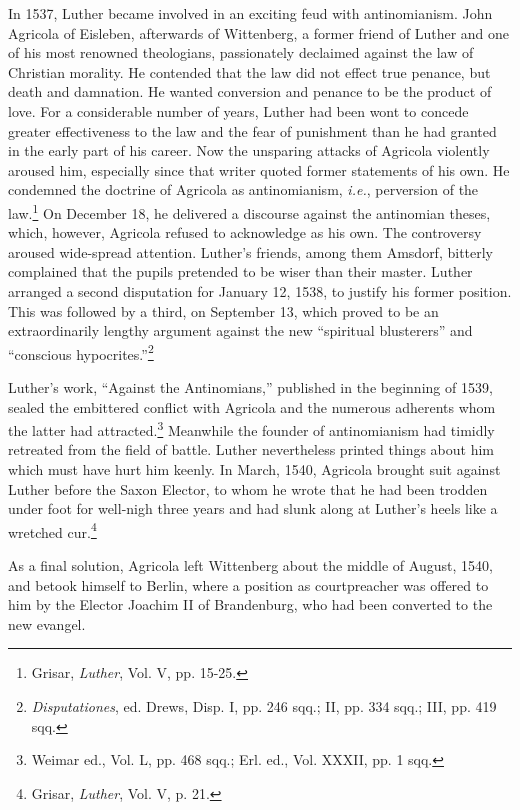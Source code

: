 In 1537, Luther became involved in an exciting feud with antinomianism.
John Agricola of Eisleben, afterwards of Wittenberg, a
former friend of Luther and one of his most renowned theologians,
passionately declaimed against the law of Christian morality. He contended
that the law did not effect true penance, but death and damnation. He
wanted conversion and penance to be the product of love.
For a considerable number of years, Luther had been wont to concede
greater effectiveness to the law and the fear of punishment than he
had granted in the early part of his career. Now the unsparing attacks
of Agricola violently aroused him, especially since that writer
quoted former statements of his own. He condemned the doctrine of
Agricola as antinomianism, \textit{i.e.}, perversion of the law.\footnote
{Grisar, \textit{Luther}, Vol. V, pp. 15-25.}
On December 18, he delivered a discourse against the antinomian theses, which,
however, Agricola refused to acknowledge as his own. The controversy
aroused wide-spread attention. Luther’s friends, among them
Amsdorf, bitterly complained that the pupils pretended to be wiser
than their master. Luther arranged a second disputation for January
12, 1538, to justify his former position. This was followed by a third,
on September 13, which proved to be an extraordinarily lengthy argument
against the new “spiritual blusterers” and “conscious hypocrites.”\footnote{\textit{Disputationes}, ed. Drews, Disp. I, pp. 246 sqq.; II, pp. 334 sqq.; III, pp. 419 sqq.}

Luther’s work, “Against the Antinomians,” published in the
beginning of 1539, sealed the embittered conflict with Agricola and
the numerous adherents whom the latter had attracted.\footnote{Weimar ed., Vol. L, pp. 468 sqq.; Erl. ed., Vol. XXXII, pp. 1 sqq.}
 Meanwhile
the founder of antinomianism had timidly retreated from the field of
battle. Luther nevertheless printed things about him which must have
hurt him keenly. In March, 1540, Agricola brought suit against Luther
before the Saxon Elector, to whom he wrote that he had been
trodden under foot for well-nigh three years and had slunk along
at Luther’s heels like a wretched cur.\footnote{Grisar, \textit{Luther}, Vol. V, p. 21.}

As a final solution, Agricola left Wittenberg about the middle of
August, 1540, and betook himself to Berlin, where a position as courtpreacher
was offered to him by the Elector Joachim II of Brandenburg, who had been
converted to the new evangel.
